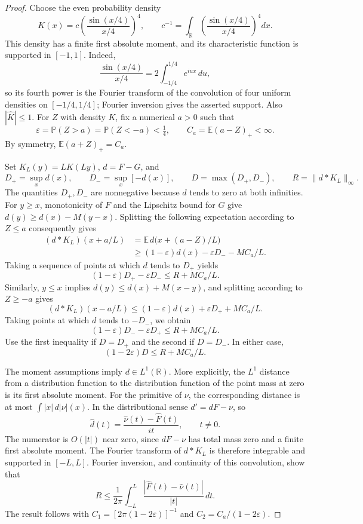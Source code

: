 \documentclass[aop]{imsart}
\theoremstyle{plain}
\theoremstyle{definition}
\theoremstyle{definition}
\newcommand{\PP}{\mathbb P}
\newcommand{\EE}{\mathbb E}
\newcommand{\R}{\mathbb R}
\begin{document}
\begin{proof}
Choose the even probability density
\[
 K(x)=c\left(\frac{\sin(x/4)}{x/4}\right)^4,
 \qquad
 c^{-1}=\int_{\R}\left(\frac{\sin(x/4)}{x/4}\right)^4dx.
\]
This density has a finite first absolute moment, and its characteristic
function is supported in \([-1,1]\).  Indeed,
\[
 \frac{\sin(x/4)}{x/4}=2\int_{-1/4}^{1/4}e^{iux}\,du,
\]
so its fourth power is the Fourier transform of the convolution of four
uniform densities on \([-1/4,1/4]\); Fourier inversion gives the asserted
support.  Also \(|\widehat K|\le1\).  For \(Z\) with density \(K\), fix a
numerical \(a>0\) such that
\[
 \varepsilon=\PP(Z>a)=\PP(Z<-a)<\tfrac14,
 \qquad C_a=\EE(a-Z)_+<\infty.
\]
By symmetry, \(\EE(a+Z)_+=C_a\).

Set \(K_L(y)=LK(Ly)\), \(d=F-G\), and
\[
 D_+=\sup_xd(x),\qquad D_-=\sup_x[-d(x)],\qquad
 D=\max(D_+,D_-),\qquad R=\|d*K_L\|_\infty.
\]
The quantities \(D_+,D_-\) are nonnegative because \(d\) tends to zero at
both infinities.  For \(y\ge x\), monotonicity of \(F\) and the Lipschitz
bound for \(G\) give \(d(y)\ge d(x)-M(y-x)\).  Splitting the following
expectation according to \(Z\le a\) consequently gives
\[
 \begin{split}
 (d*K_L)(x+a/L)
 &=\EE\,d\bigl(x+(a-Z)/L\bigr)\\
 &\ge(1-\varepsilon)d(x)-\varepsilon D_- -MC_a/L.
 \end{split}
\]
Taking a sequence of points at which \(d\) tends to \(D_+\) yields
\[
 (1-\varepsilon)D_+-\varepsilon D_-\le R+MC_a/L.
\]
Similarly, \(y\le x\) implies \(d(y)\le d(x)+M(x-y)\), and splitting
according to \(Z\ge-a\) gives
\[
 (d*K_L)(x-a/L)
 \le(1-\varepsilon)d(x)+\varepsilon D_++MC_a/L.
\]
Taking points at which \(d\) tends to \(-D_-\), we obtain
\[
 (1-\varepsilon)D_--\varepsilon D_+\le R+MC_a/L.
\]
Use the first inequality if \(D=D_+\) and the second if \(D=D_-\).  In
either case,
\[
 (1-2\varepsilon)D\le R+MC_a/L.
\]

The moment assumptions imply \(d\in L^1(\R)\).  More explicitly, the
\(L^1\) distance from a distribution function to the distribution function
of the point mass at zero is its first absolute moment.  For the primitive
of \(\nu\), the corresponding distance is at most
\(\int|x|\,d|\nu|(x)\).  In the distributional sense \(d'=dF-\nu\), so
\[
 \widehat d(t)=\frac{\widehat\nu(t)-\widehat F(t)}{it},\qquad t\ne0.
\]
The numerator is \(O(|t|)\) near zero, since \(dF-\nu\) has total mass
zero and a finite first absolute moment.  The Fourier transform of
\(d*K_L\) is therefore integrable and supported in \([-L,L]\).  Fourier
inversion, and continuity of this convolution, show that
\[
 R\le\frac1{2\pi}\int_{-L}^{L}
             \frac{|\widehat F(t)-\widehat\nu(t)|}{|t|}\,dt.
\]
The result follows with
\(C_1=[2\pi(1-2\varepsilon)]^{-1}\) and
\(C_2=C_a/(1-2\varepsilon)\).
\end{proof}
\end{document}
